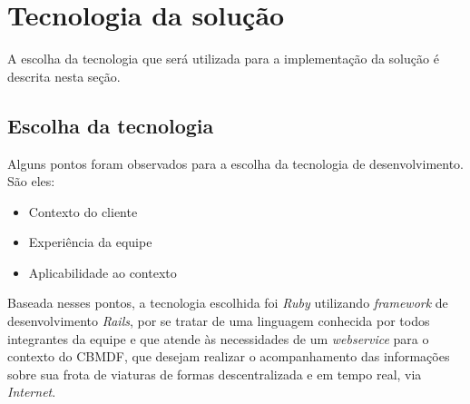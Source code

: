 \chapter[Tecnologia da solução]{Tecnologia da solução}

  A escolha da tecnologia que será utilizada para a implementação da solução é descrita nesta seção.
  
  \section{Escolha da tecnologia}
  
    Alguns pontos foram observados para a escolha da tecnologia de desenvolvimento. São eles:
    
    \begin{itemize}
     \item Contexto do cliente
     \item Experiência da equipe
     \item Aplicabilidade ao contexto
    \end{itemize}
    
    Baseada nesses pontos, a tecnologia escolhida foi \textit{Ruby} utilizando \textit{framework} de desenvolvimento \textit{Rails},
    por se tratar de uma linguagem conhecida por todos integrantes da equipe e que atende às necessidades 
    de um \textit{webservice} para o contexto do CBMDF, que desejam realizar o acompanhamento das informações sobre sua 
    frota de viaturas de formas descentralizada e em tempo real, via \textit{Internet}.
